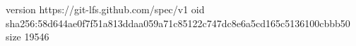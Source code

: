 version https://git-lfs.github.com/spec/v1
oid sha256:58d644ae0f7f51a813ddaa059a71c85122c747dc8e6a5cd165c5136100cbbb50
size 19546
